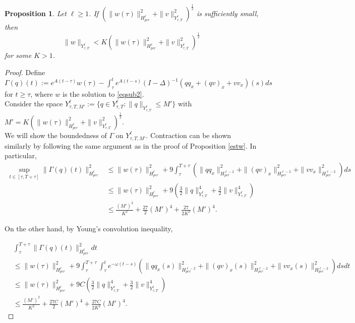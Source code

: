 \documentclass[10pt,a4paper,final]{article}
\numberwithin{equation}{section}
\newcommand{\ds}{\displaystyle}
\newtheorem{prop}[theorem]{Proposition}
\begin{document}
\begin{prop} \label{wYlT}
Let $\ell\geq 1$. If $(\|w(\tau)\|_{H^{\ell}_{per}}^2+\|v\|_{Y^{\ell}_{\tau,T}}^2)^{\frac12}$ is sufficiently small, then 
    $$\|w\|_{Y^{\ell}_{\tau,T}}<K(\|w(\tau)\|_{H^{\ell}_{per}}^2+\|v\|_{Y^{\ell}_{\tau,T}}^2)^{\frac12}$$
for some $K>1$.
\end{prop}
\begin{proof}
    Define $\ds \Gamma(q)(t):=e^{A(t-\tau)}w(\tau)-\int_{\tau}^{t}e^{A(t-s)}(I-\Delta)^{-1}(qq_x+(qv)_x+vv_x)(s)ds$ for $t\geq \tau$, where $w$ is the solution to \eqref{eqsub2}.\\

 Consider the space $Y^\ell_{\tau,T,M'}:=\{q\in Y^{\ell}_{\tau,T}:\|q\|_{Y^{\ell}_{\tau,T}}\leq M'\}$ with $M'=K(\|w(\tau)\|_{H^{\ell}_{per}}^2+\|v\|_{Y^{\ell}_{\tau,T}}^2)^{\frac12}$.\\

    We will show the boundedness of $\Gamma$ on $Y^{\ell}_{\tau,T,M'}$. Contraction can be shown similarly by following the same argument as in the proof of Proposition \ref{estw}. In particular,     
    \begin{align*}
       \sup_{t\in [\tau,T+\tau]} \|\Gamma(q)(t)\|_{H^{\ell}_{per}}^2&\leq \|w(\tau)\|_{H^{\ell}_{per}}^2+9\int_\tau^{T+\tau}(\|qq_x\|_{H^{\ell-2}_{per}}^2+\|(qv)_x\|^2_{H^{\ell-2}_{per}}+\|vv_x\|_{H^{\ell-2}_{per}}^2)ds\\
        &\leq \|w(\tau)\|_{H^{\ell}_{per}}^2+9(\frac{3}{2}\|q\|_{Y^{\ell}_{\tau,T}}^4+\frac{3}{2}\|v\|_{Y^{\ell}_{\tau,T}}^4)\\
        &\leq \frac{(M')^2}{K^2}+\frac{27}{2}(M')^4+\frac{27}{2K^2}(M')^4.
        \end{align*}

    On the other hand, by Young's convolution inequality,

       \begin{align*}
     &\int_{\tau}^{T+\tau}\|\Gamma(q)(t)\|_{H^{\ell}_{per}}^2dt\\&\leq \|w(\tau)\|_{H^{\ell}_{per}}^2+9\int_{\tau}^{T+\tau}\int_\tau^{t}e^{-\omega(t-s)}(\|qq_x(s)\|_{H^{\ell-2}_{per}}^2+\|(qv)_x(s)\|^2_{H^{\ell-2}_{per}}+\|vv_x(s)\|_{H^{\ell-2}_{per}}^2)dsdt\\
        &\leq \|w(\tau)\|_{H^{\ell}_{per}}^2+9C(\frac{3}{2}\|q\|_{Y^{\ell}_{\tau,T}}^4+\frac{3}{2}\|v\|_{Y^{\ell}_{\tau,T}}^4)\\
        &\leq \frac{(M')^2}{K^2}+\frac{27C}{2}(M')^4+\frac{27C}{2K^2}(M')^4.
    \end{align*}
    

\end{proof}
\end{document}
